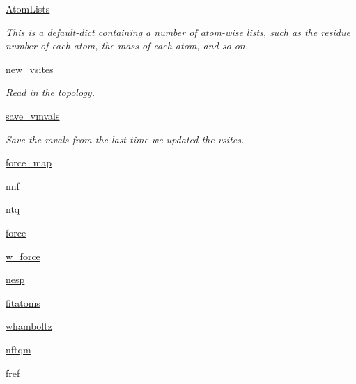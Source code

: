 \begin{DoxyCompactItemize}
\hyperlink{classforcebalance_1_1abinitio_1_1AbInitio_a7e62a74e820ac0c5dd67f49155b95c41}{Atom\-Lists}
\begin{DoxyCompactList}\small\item\em This is a default-\/dict containing a number of atom-\/wise lists, such as the residue number of each atom, the mass of each atom, and so on. \end{DoxyCompactList}\item 
\hyperlink{classforcebalance_1_1abinitio_1_1AbInitio_a64f1aeadac4d7b09424c20b83e5ad5af}{new\-\_\-vsites}
\begin{DoxyCompactList}\small\item\em Read in the topology. \end{DoxyCompactList}\item 
\hyperlink{classforcebalance_1_1abinitio_1_1AbInitio_a22037bf43728fa45f387390005e0b131}{save\-\_\-vmvals}
\begin{DoxyCompactList}\small\item\em Save the mvals from the last time we updated the vsites. \end{DoxyCompactList}\item 
\hyperlink{classforcebalance_1_1abinitio_1_1AbInitio_a6558ea4f56053b0f539f987481c57a75}{force\-\_\-map}
\item 
\hyperlink{classforcebalance_1_1abinitio_1_1AbInitio_ac4a5765bf5b089176518f47004fcdb39}{nnf}
\item 
\hyperlink{classforcebalance_1_1abinitio_1_1AbInitio_af8a895f61ddea6b9ca2765ddbf309a75}{ntq}
\item 
\hyperlink{classforcebalance_1_1abinitio_1_1AbInitio_ab483592ce22356d09b52eb594f2f4b8e}{force}
\item 
\hyperlink{classforcebalance_1_1abinitio_1_1AbInitio_a4ec4863edbb6ea4a28777de905d621d3}{w\-\_\-force}
\item 
\hyperlink{classforcebalance_1_1abinitio_1_1AbInitio_ac258ad6180275ba2ffe5f68d1217e4ac}{nesp}
\item 
\hyperlink{classforcebalance_1_1abinitio_1_1AbInitio_a8b12ea0418108cc6c7693d75cc00227f}{fitatoms}
\item 
\hyperlink{classforcebalance_1_1abinitio_1_1AbInitio_a8f70f017ca8ec54c1acdbc85eff06ab9}{whamboltz}
\item 
\hyperlink{classforcebalance_1_1abinitio_1_1AbInitio_a64ae24d7e979723e65358e227b132a4a}{nftqm}
\item 
\hyperlink{classforcebalance_1_1abinitio_1_1AbInitio_ac974dfef45b416947dd21876443d808a}{fref}

\end{DoxyCompactItemize}
